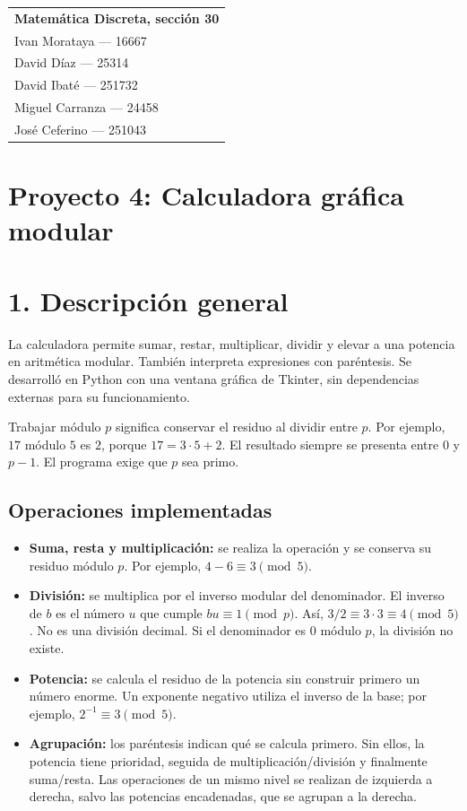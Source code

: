 \documentclass[11pt,a4paper]{article}
\begin{document}
{\small
\begin{tabular}{@{}l@{}}
\textbf{Matemática Discreta, sección 30} \\
Ivan Morataya --- 16667 \\
David Díaz --- 25314 \\
David Ibaté --- 251732 \\
Miguel Carranza --- 24458 \\
José Ceferino --- 251043
\end{tabular}
}
\section*{Proyecto 4: Calculadora gráfica modular}
\section*{1. Descripción general}
La calculadora permite sumar, restar, multiplicar, dividir y elevar a una
potencia en aritmética modular. También interpreta expresiones con paréntesis.
Se desarrolló en Python con una ventana gráfica de Tkinter, sin dependencias
externas para su funcionamiento.

Trabajar módulo $p$ significa conservar el residuo al dividir entre $p$.
Por ejemplo, $17$ módulo $5$ es $2$, porque $17=3\cdot5+2$. El resultado
siempre se presenta entre $0$ y $p-1$. El programa exige que $p$ sea primo.

\subsection*{Operaciones implementadas}
\begin{itemize}
\item \textbf{Suma, resta y multiplicación:} se realiza la operación y se
conserva su residuo módulo $p$. Por ejemplo, $4-6\equiv3\pmod5$.
\item \textbf{División:} se multiplica por el inverso modular del denominador.
El inverso de $b$ es el número $u$ que cumple $bu\equiv1\pmod p$.
Así, $3/2\equiv3\cdot3\equiv4\pmod5$. No es una división decimal.
Si el denominador es $0$ módulo $p$, la división no existe.
\item \textbf{Potencia:} se calcula el residuo de la potencia sin construir
primero un número enorme. Un exponente negativo utiliza el inverso de la
base; por ejemplo, $2^{-1}\equiv3\pmod5$.
\item \textbf{Agrupación:} los paréntesis indican qué se calcula primero.
Sin ellos, la potencia tiene prioridad, seguida de multiplicación/división
y finalmente suma/resta. Las operaciones de un mismo nivel se realizan de
izquierda a derecha, salvo las potencias encadenadas, que se agrupan a la derecha.
\end{itemize}
\end{document}
